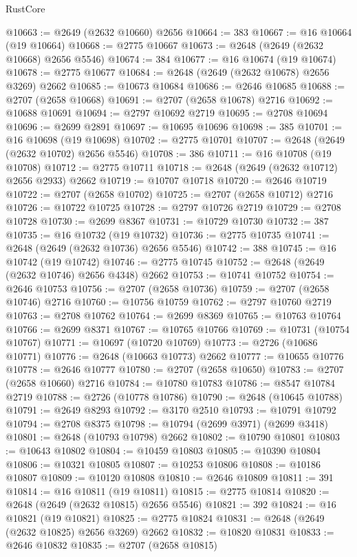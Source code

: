 \begin{lexlean}{RustCore}
\begin{coremodule}
@10663 := @2649 (@2632 @10660) @2656
@10664 := 383
@10667 := @16 @10664 (@19 @10664)
@10668 := @2775 @10667
@10673 := @2648 (@2649 (@2632 @10668) @2656 @5546)
@10674 := 384
@10677 := @16 @10674 (@19 @10674)
@10678 := @2775 @10677
@10684 := @2648 (@2649 (@2632 @10678) @2656 @3269) @2662
@10685 := @10673 @10684
@10686 := @2646 @10685
@10688 := @2707 (@2658 @10668)
@10691 := @2707 (@2658 @10678) @2716
@10692 := @10688 @10691
@10694 := @2797 @10692 @2719
@10695 := @2708 @10694
@10696 := @2699 @2891
@10697 := @10695 @10696
@10698 := 385
@10701 := @16 @10698 (@19 @10698)
@10702 := @2775 @10701
@10707 := @2648 (@2649 (@2632 @10702) @2656 @5546)
@10708 := 386
@10711 := @16 @10708 (@19 @10708)
@10712 := @2775 @10711
@10718 := @2648 (@2649 (@2632 @10712) @2656 @2933) @2662
@10719 := @10707 @10718
@10720 := @2646 @10719
@10722 := @2707 (@2658 @10702)
@10725 := @2707 (@2658 @10712) @2716
@10726 := @10722 @10725
@10728 := @2797 @10726 @2719
@10729 := @2708 @10728
@10730 := @2699 @8367
@10731 := @10729 @10730
@10732 := 387
@10735 := @16 @10732 (@19 @10732)
@10736 := @2775 @10735
@10741 := @2648 (@2649 (@2632 @10736) @2656 @5546)
@10742 := 388
@10745 := @16 @10742 (@19 @10742)
@10746 := @2775 @10745
@10752 := @2648 (@2649 (@2632 @10746) @2656 @4348) @2662
@10753 := @10741 @10752
@10754 := @2646 @10753
@10756 := @2707 (@2658 @10736)
@10759 := @2707 (@2658 @10746) @2716
@10760 := @10756 @10759
@10762 := @2797 @10760 @2719
@10763 := @2708 @10762
@10764 := @2699 @8369
@10765 := @10763 @10764
@10766 := @2699 @8371
@10767 := @10765 @10766
@10769 := @10731 (@10754 @10767)
@10771 := @10697 (@10720 @10769)
@10773 := @2726 (@10686 @10771)
@10776 := @2648 (@10663 @10773) @2662
@10777 := @10655 @10776
@10778 := @2646 @10777
@10780 := @2707 (@2658 @10650)
@10783 := @2707 (@2658 @10660) @2716
@10784 := @10780 @10783
@10786 := @8547 @10784 @2719
@10788 := @2726 (@10778 @10786)
@10790 := @2648 (@10645 @10788)
@10791 := @2649 @8293
@10792 := @3170 @2510
@10793 := @10791 @10792
@10794 := @2708 @8375
@10798 := @10794 (@2699 @3971) (@2699 @3418)
@10801 := @2648 (@10793 @10798) @2662
@10802 := @10790 @10801
@10803 := @10643 @10802
@10804 := @10459 @10803
@10805 := @10390 @10804
@10806 := @10321 @10805
@10807 := @10253 @10806
@10808 := @10186 @10807
@10809 := @10120 @10808
@10810 := @2646 @10809
@10811 := 391
@10814 := @16 @10811 (@19 @10811)
@10815 := @2775 @10814
@10820 := @2648 (@2649 (@2632 @10815) @2656 @5546)
@10821 := 392
@10824 := @16 @10821 (@19 @10821)
@10825 := @2775 @10824
@10831 := @2648 (@2649 (@2632 @10825) @2656 @3269) @2662
@10832 := @10820 @10831
@10833 := @2646 @10832
@10835 := @2707 (@2658 @10815)

\end{coremodule}
\end{lexlean}
